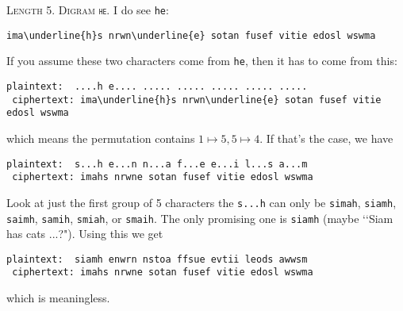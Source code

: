 \textsc{Length 5. Digram \texttt{he}.}
I do see \verb!he!:
\begin{Verbatim}[commandchars=\\\{\}]
  ima\underline{h}s nrwn\underline{e} sotan fusef vitie edosl wswma
\end{Verbatim}
If you assume these two characters come from \verb!he!, then it has to come from this:
\begin{Verbatim}[commandchars=\\\{\}]
 plaintext:  ....h e.... ..... ..... ..... ..... .....
 ciphertext: ima\underline{h}s nrwn\underline{e} sotan fusef vitie edosl wswma
\end{Verbatim}
which means the permutation contains $1 \mapsto 5, 5 \mapsto 4$.
If that's the case, we have
\begin{Verbatim}[commandchars=\\\{\}]
 plaintext:  s...h e...n n...a f...e e...i l...s a...m
 ciphertext: imahs nrwne sotan fusef vitie edosl wswma
\end{Verbatim}
Look at just the first group of 5 characters
the \verb!s...h! can only be
\verb!simah!,
\verb!siamh!,
\verb!saimh!,
\verb!samih!,
\verb!smiah!, or
\verb!smaih!.
The only promising one is \verb!siamh! (maybe \lq\lq Siam has cats ...?").
Using this we get
\begin{Verbatim}[commandchars=\\\{\}]
 plaintext:  siamh enwrn nstoa ffsue evtii leods awwsm
 ciphertext: imahs nrwne sotan fusef vitie edosl wswma
\end{Verbatim}
which is meaningless.


